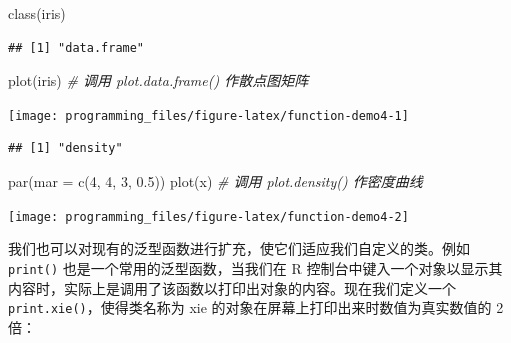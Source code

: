 \documentclass[
  b5paper,
  UTF8,twoside]{book}
\newenvironment{Shaded}{\begin{snugshade}}{\end{snugshade}}
\newcommand{\AttributeTok}[1]{\textcolor[rgb]{0.77,0.63,0.00}{#1}}
\newcommand{\CommentTok}[1]{\textcolor[rgb]{0.56,0.35,0.01}{\textit{#1}}}
\newcommand{\DecValTok}[1]{\textcolor[rgb]{0.00,0.00,0.81}{#1}}
\newcommand{\FloatTok}[1]{\textcolor[rgb]{0.00,0.00,0.81}{#1}}
\newcommand{\FunctionTok}[1]{\textcolor[rgb]{0.00,0.00,0.00}{#1}}
\newcommand{\NormalTok}[1]{#1}
\newcommand{\OtherTok}[1]{\textcolor[rgb]{0.56,0.35,0.01}{#1}}
\newcommand{\SpecialCharTok}[1]{\textcolor[rgb]{0.00,0.00,0.00}{#1}}
\begin{document}
\begin{Shaded}
\begin{Highlighting}[]
\FunctionTok{class}\NormalTok{(iris)}
\end{Highlighting}
\end{Shaded}

\begin{verbatim}
## [1] "data.frame"
\end{verbatim}

\begin{Shaded}
\begin{Highlighting}[]
\FunctionTok{plot}\NormalTok{(iris) }\CommentTok{\# 调用 plot.data.frame() 作散点图矩阵}
\end{Highlighting}
\end{Shaded}

\begin{center}\texttt{[image: programming\_files/figure-latex/function-demo4-1]} \end{center}

\begin{Shaded}
\end{Shaded}

\begin{verbatim}
## [1] "density"
\end{verbatim}

\begin{Shaded}
\begin{Highlighting}[]
\FunctionTok{par}\NormalTok{(}\AttributeTok{mar =} \FunctionTok{c}\NormalTok{(}\DecValTok{4}\NormalTok{, }\DecValTok{4}\NormalTok{, }\DecValTok{3}\NormalTok{, }\FloatTok{0.5}\NormalTok{))}
\FunctionTok{plot}\NormalTok{(x) }\CommentTok{\# 调用 plot.density() 作密度曲线}
\end{Highlighting}
\end{Shaded}

\begin{center}\texttt{[image: programming\_files/figure-latex/function-demo4-2]} \end{center}

我们也可以对现有的泛型函数进行扩充，使它们适应我们自定义的类。例如 \texttt{print()} 也是一个常用的泛型函数，当我们在 R 控制台中键入一个对象以显示其内容时，实际上是调用了该函数以打印出对象的内容。现在我们定义一个 \texttt{print.xie()}，使得类名称为 xie 的对象在屏幕上打印出来时数值为真实数值的 2 倍：
\end{document}
